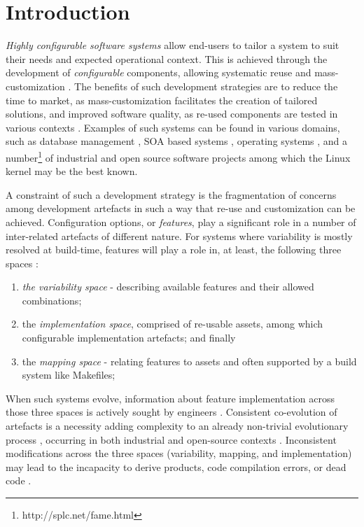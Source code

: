 
\section{Introduction}
\label{sec:Introduction}
\textit{Highly configurable software systems} allow end-users to tailor a system to suit their needs and expected operational context.
This is achieved through the development of \textit{configurable} components, allowing systematic reuse and mass-customization \citep{van_gurp_notion_2001}.
The benefits of such development strategies are to reduce the time to market, as mass-customization facilitates the creation of tailored solutions, and improved software quality, as re-used components are tested in various contexts \citep{clements_software_2002}.
Examples of such systems can be found in various domains, such as database management \citep{rosenmuller_fame-dbms:_2008,batory_genesis:_1988}, SOA based systems \citep{kumara_sharing_2013}, 
operating systems \citep{berger_variability_2010}, and a number\footnote{http://splc.net/fame.html}  of industrial
and open source software projects \citep{liebig_analysis_2010} among which the Linux kernel may be the best known.

A constraint of such a development strategy is the  fragmentation of concerns among development artefacts in such a 
way that re-use and customization can be achieved.  
Configuration options, or \textit{features}, play a significant role in a number of inter-related artefacts of different nature.
For systems where variability is mostly resolved at build-time, features will play a role in, at least, the following three spaces \citep{neves_safe_2015,dietrich_understanding_2012}:  
\begin{enumerate}
\item \textit{the variability space} - describing available features and their allowed combinations; 
\item the \textit{implementation space}, comprised of re-usable assets, among which configurable implementation artefacts;
and finally
\item the \textit{mapping space} - relating features to assets and often supported by a build system like Makefiles;  
\end{enumerate}
When such systems evolve, information about feature implementation across those three spaces is actively sought by engineers \citep{heider_case_2012}.
Consistent co-evolution of artefacts is a necessity adding complexity to an already non-trivial evolutionary process \citep{mens_challenges_2005}, 
occurring in both industrial \citep{hellebrand_coevolution_2014} and open-source contexts \citep{passos_coevolution_2015,hunsen_preprocessor-based_2015}.
Inconsistent modifications across the three spaces (variability, mapping, and implementation) may lead 
to the incapacity to derive products, code compilation errors, or dead code \citep{tartler_feature_2011,nadi_mining_2012,abal_42_2014}.

